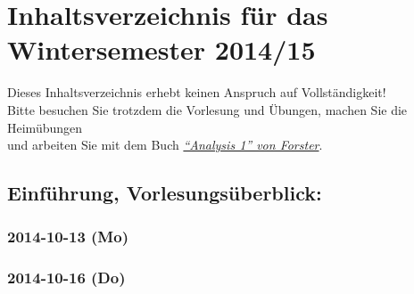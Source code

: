 \fancyhead[R]{}
{}
\chapter*{Inhaltsverzeichnis für das Wintersemester 2014/15}
Dieses Inhaltsverzeichnis erhebt keinen Anspruch auf Vollständigkeit!\\
Bitte besuchen Sie trotzdem die Vorlesung und Übungen, machen Sie die Heimübungen\\
und arbeiten Sie mit dem Buch \href{http://www.amazon.de/Analysis-Differential--Integralrechnung-Ver\%C3\%A4nderlichen-Mathematik/dp/3658003162/ref=sr\_1\_1?ie=UTF8\&qid=1414666359\&sr=8-1\&keywords=analysis+1+forster}{\textit{"`Analysis 1"' von Forster}}.
\section*{Einführung, Vorlesungsüberblick:}
\subsection*{2014-10-13 (Mo)}

\subsection*{2014-10-16 (Do)}


